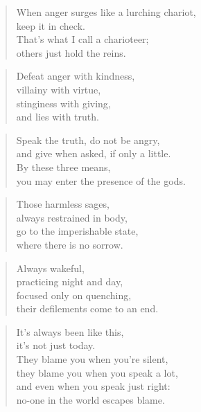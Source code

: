 \documentclass[12pt,openany]{book}%
\begin{document}
\begin{verse}%
When anger surges like a lurching chariot, \\
keep it in check. \\
That’s what I call a charioteer; \\
others just hold the reins. 

%
\end{verse}

\begin{verse}%
Defeat anger with kindness, \\
villainy with virtue, \\
stinginess with giving, \\
and lies with truth. 

%
\end{verse}

\begin{verse}%
Speak the truth, do not be angry, \\
and give when asked, if only a little. \\
By these three means, \\
you may enter the presence of the gods. 

%
\end{verse}

\begin{verse}%
Those harmless sages, \\
always restrained in body, \\
go to the imperishable state, \\
where there is no sorrow. 

%
\end{verse}

\begin{verse}%
Always wakeful, \\
practicing night and day, \\
focused only on quenching, \\
their defilements come to an end. 

%
\end{verse}

\begin{verse}%
It’s always been like this, \\
it’s not just today. \\
They blame you when you’re silent, \\
they blame you when you speak a lot, \\
and even when you speak just right: \\
no-one in the world escapes blame. 

%
\end{verse}
\end{document}
